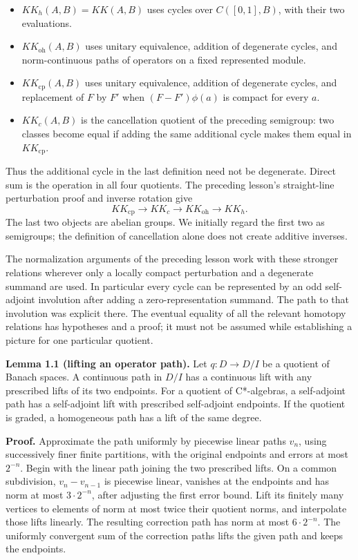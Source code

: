 \documentclass[
  11pt,
]{article}
\providecommand{\tightlist}{%
  \setlength{\itemsep}{0pt}\setlength{\parskip}{0pt}}
\begin{document}
\begin{itemize}
\tightlist
\item
  \(KK_h(A,B)=KK(A,B)\) uses cycles over \(C([0,1],B)\), with their two
  evaluations.
\item
  \(KK_{\mathrm{oh}}(A,B)\) uses unitary equivalence, addition of
  degenerate cycles, and norm-continuous paths of operators on a fixed
  represented module.
\item
  \(KK_{\mathrm{cp}}(A,B)\) uses unitary equivalence, addition of
  degenerate cycles, and replacement of \(F\) by \(F'\) when
  \((F-F')\phi(a)\) is compact for every \(a\).
\item
  \(KK_c(A,B)\) is the cancellation quotient of the preceding semigroup:
  two classes become equal if adding the same additional cycle makes
  them equal in \(KK_{\mathrm{cp}}\).
\end{itemize}

Thus the additional cycle in the last definition need not be degenerate.
Direct sum is the operation in all four quotients. The preceding
lesson's straight-line perturbation proof and inverse rotation give \[
KK_{\mathrm{cp}}\longrightarrow KK_c
\longrightarrow KK_{\mathrm{oh}}\longrightarrow KK_h.
\tag{1.1}
\] The last two objects are abelian groups. We initially regard the
first two as semigroups; the definition of cancellation alone does not
create additive inverses.

The normalization arguments of the preceding lesson work with these
stronger relations wherever only a locally compact perturbation and a
degenerate summand are used. In particular every cycle can be
represented by an odd self-adjoint involution after adding a
zero-representation summand. The path to that involution was explicit
there. The eventual equality of all the relevant homotopy relations has
hypotheses and a proof; it must not be assumed while establishing a
picture for one particular quotient.

\textbf{Lemma 1.1 (lifting an operator path).} Let \(q:D\to D/I\) be a
quotient of Banach spaces. A continuous path in \(D/I\) has a continuous
lift with any prescribed lifts of its two endpoints. For a quotient of
C*-algebras, a self-adjoint path has a self-adjoint lift with prescribed
self-adjoint endpoints. If the quotient is graded, a homogeneous path
has a lift of the same degree.

\textbf{Proof.} Approximate the path uniformly by piecewise linear paths
\(v_n\), using successively finer finite partitions, with the original
endpoints and errors at most \(2^{-n}\). Begin with the linear path
joining the two prescribed lifts. On a common subdivision,
\(v_n-v_{n-1}\) is piecewise linear, vanishes at the endpoints and has
norm at most \(3\cdot2^{-n}\), after adjusting the first error bound.
Lift its finitely many vertices to elements of norm at most twice their
quotient norms, and interpolate those lifts linearly. The resulting
correction path has norm at most \(6\cdot2^{-n}\). The uniformly
convergent sum of the correction paths lifts the given path and keeps
the endpoints.
\end{document}

